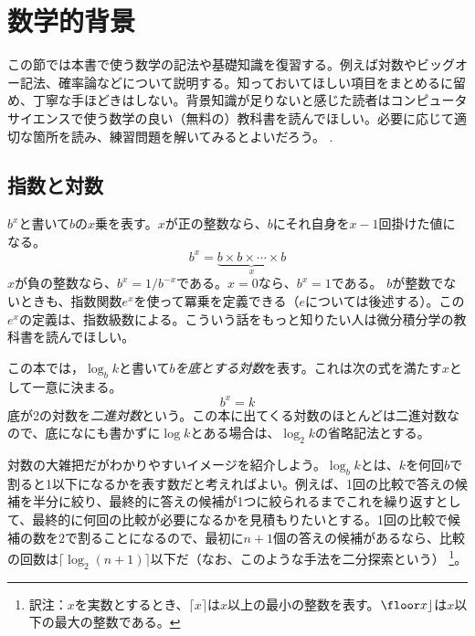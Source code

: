 \section{数学的背景}
この節では本書で使う数学の記法や基礎知識を復習する。例えば対数やビッグオー記法、確率論などについて説明する。知っておいてほしい項目をまとめるに留め、丁寧な手ほどきはしない。背景知識が足りないと感じた読者はコンピュータサイエンスで使う数学の良い（無料の）教科書を読んでほしい。必要に応じて適切な箇所を読み、練習問題を解いてみるとよいだろう。
\cite{llm11}.

\subsection{指数と対数}

$b^x$と書いて$b$の$x$乗を表す。$x$が正の整数なら、$b$にそれ自身を$x-1$回掛けた値になる。
\[
    b^x = \underbrace{b\times b\times \cdots \times b}_{x}
\]
$x$が負の整数なら、$b^x=1/b^{-x}$である。$x=0$なら、$b^x=1$である。
$b$が整数でないときも、指数関数$e^x$を使って冪乗を定義できる（$e$については後述する）。この$e^x$の定義は、指数級数による。こういう話をもっと知りたい人は微分積分学の教科書を読んでほしい。

この本では，$\log_b k$と書いて\emph{$b$を底とする対数}を表す。これは次の式を満たす$x$として一意に決まる。
\[
    b^{x} = k
\]
底が2の対数を\emph{二進対数}という。この本に出てくる対数のほとんどは二進対数なので、底になにも書かずに$\log k$とある場合は、$\log_2 k$の省略記法とする。
%
%

対数の大雑把だがわかりやすいイメージを紹介しよう。$\log_b k$とは、$k$を何回$b$で割ると1以下になるかを表す数だと考えればよい。例えば、1回の比較で答えの候補を半分に絞り、最終的に答えの候補が1つに絞られるまでこれを繰り返すとして、最終的に何回の比較が必要になるかを見積もりたいとする。1回の比較で候補の数を$2$で割ることになるので、最初に$n+1$個の答えの候補があるなら、比較の回数は$\lceil \log_2(n+1) \rceil$以下だ（なお、このような手法を二分探索という）%
\footnote{訳注：$x$を実数とするとき、$\lceil x \rceil$は$x$以上の最小の整数を表す。$\floor x \rfloor$は$x$以下の最大の整数である。}。

